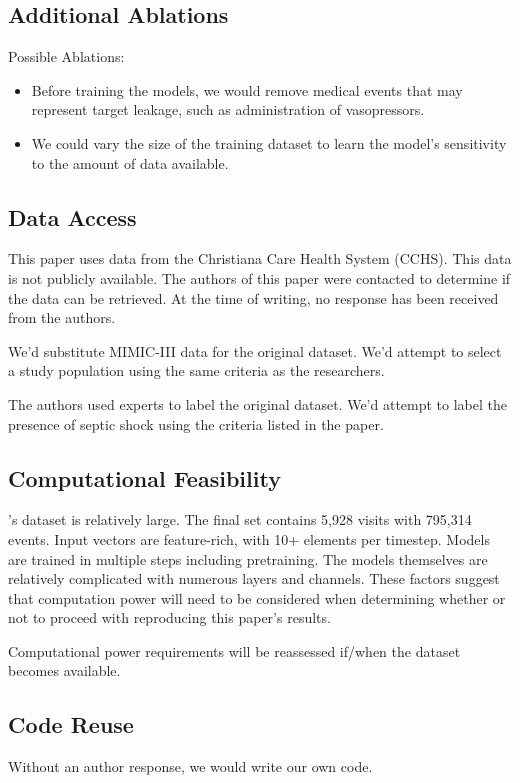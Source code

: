 \documentclass[11pt,a4paper]{article}
\begin{document}
{\subsection{Additional Ablations}
Possible Ablations:
\begin{itemize}
  \item Before training the models, we would remove medical events that may represent target leakage, such as administration of vasopressors.
  \item We could vary the size of the training dataset to learn the model's sensitivity to the amount of data available.
\end{itemize}

\subsection{Data Access}
This paper uses data from the Christiana Care Health System (CCHS). This data is not publicly available. The authors of this paper were contacted to determine if the data can be retrieved. At the time of writing, no response has been received from the authors.

We'd substitute MIMIC-III data for the original dataset. We'd attempt to select a study population using the same criteria as the researchers.

The authors used experts to label the original dataset. We'd attempt to label the presence of septic shock using the criteria listed in the paper.

\subsection{Computational Feasibility}

\citeauthor{zhang_2019}'s \citeyearpar{zhang_2019} dataset is relatively large. The final set contains 5,928 visits with 795,314 events. Input vectors are feature-rich, with 10+ elements per timestep. Models are trained in multiple steps including pretraining. The models themselves are relatively complicated with numerous layers and channels. These factors suggest that computation power will need to be considered when determining whether or not to proceed with reproducing this paper's results. 

Computational power requirements will be reassessed if/when the dataset becomes available. 

\subsection{Code Reuse}
Without an author response, we would write our own code.

}
\end{document}

